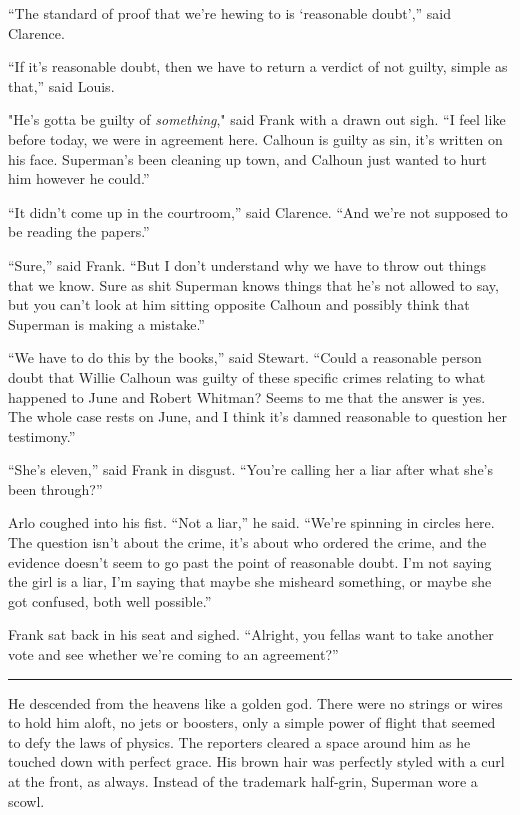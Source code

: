 ``The standard of proof that we're hewing to is `reasonable doubt',''
said Clarence.

``If it's reasonable doubt, then we have to return a verdict of not
guilty, simple as that,'' said Louis.

"He's gotta be guilty of \emph{something}," said Frank with a drawn out
sigh. ``I feel like before today, we were in agreement here. Calhoun is
guilty as sin, it's written on his face. Superman's been cleaning up
town, and Calhoun just wanted to hurt him however he could.''

``It didn't come up in the courtroom,'' said Clarence. ``And we're not
supposed to be reading the papers.''

``Sure,'' said Frank. ``But I don't understand why we have to throw out
things that we know. Sure as shit Superman knows things that he's not
allowed to say, but you can't look at him sitting opposite Calhoun and
possibly think that Superman is making a mistake.''

``We have to do this by the books,'' said Stewart. ``Could a reasonable
person doubt that Willie Calhoun was guilty of these specific crimes
relating to what happened to June and Robert Whitman? Seems to me that
the answer is yes. The whole case rests on June, and I think it's damned
reasonable to question her testimony.''

``She's eleven,'' said Frank in disgust. ``You're calling her a liar
after what she's been through?''

Arlo coughed into his fist. ``Not a liar,'' he said. ``We're spinning in
circles here. The question isn't about the crime, it's about who ordered
the crime, and the evidence doesn't seem to go past the point of
reasonable doubt. I'm not saying the girl is a liar, I'm saying that
maybe she misheard something, or maybe she got confused, both well
possible.''

Frank sat back in his seat and sighed. ``Alright, you fellas want to
take another vote and see whether we're coming to an agreement?''

\begin{center}\rule{0.5\linewidth}{\linethickness}\end{center}

He descended from the heavens like a golden god. There were no strings
or wires to hold him aloft, no jets or boosters, only a simple power of
flight that seemed to defy the laws of physics. The reporters cleared a
space around him as he touched down with perfect grace. His brown hair
was perfectly styled with a curl at the front, as always. Instead of the
trademark half‐grin, Superman wore a scowl.


